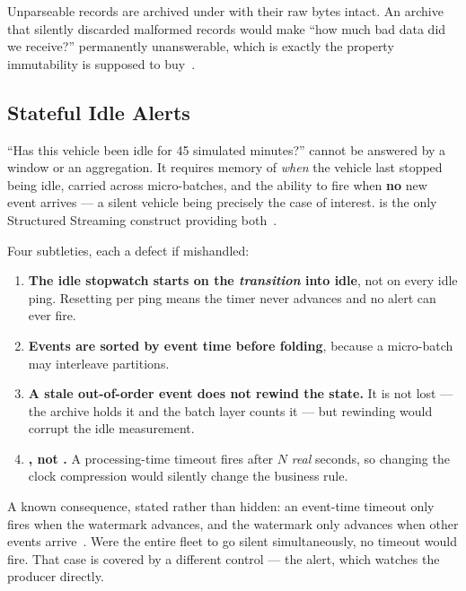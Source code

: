Unparseable records are archived under  with
their raw bytes intact. An archive that silently discarded malformed
records would make ``how much bad data did we receive?'' permanently
unanswerable, which is exactly the property immutability is supposed to
buy~\cite{helland2015immutability}.

\subsection{Stateful Idle Alerts}
\label{sec:impl-idle}

``Has this vehicle been idle for 45 simulated minutes?'' cannot be
answered by a window or an aggregation. It requires memory of \emph{when}
the vehicle last stopped being idle, carried across micro-batches, and
the ability to fire when \textbf{no} new event arrives --- a silent
vehicle being precisely the case of interest.
 is the only Structured Streaming construct
providing both~\cite{spark_ss_guide}.

Four subtleties, each a defect if mishandled:

\begin{enumerate}
  \item \textbf{The idle stopwatch starts on the \emph{transition} into
        idle}, not on every idle ping. Resetting per ping means the timer
        never advances and no alert can ever fire.
  \item \textbf{Events are sorted by event time before folding}, because
        a micro-batch may interleave partitions.
  \item \textbf{A stale out-of-order event does not rewind the state.} It
        is not lost --- the archive holds it and the batch layer counts it
        --- but rewinding would corrupt the idle measurement.
  \item \textbf{, not .}
        A processing-time timeout fires after $N$ \emph{real} seconds, so
        changing the clock compression would silently change the business
        rule.
\end{enumerate}

A known consequence, stated rather than hidden: an event-time timeout
only fires when the watermark advances, and the watermark only advances
when other events arrive~\cite{akidau2015dataflow}. Were the entire fleet
to go silent simultaneously, no timeout would fire. That case is covered
by a different control --- the  alert, which
watches the producer directly.

